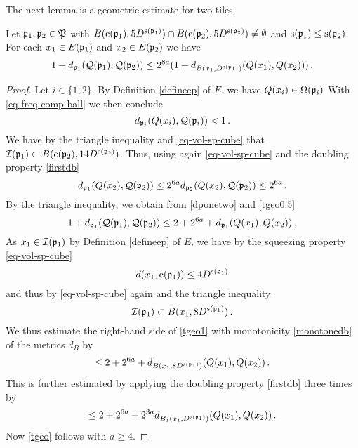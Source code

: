 The next lemma is a geometric estimate for two tiles.
\begin{lemma}\label{tile-uncertainty}
\leanok
{}
    Let ${\mathfrak p}_1, {\mathfrak p}_2\in {\mathfrak P}$ with
    $B({\mathrm{c}}({\mathfrak p}_1),5D^{{\mathrm{s}}({\mathfrak p}_1)}) \cap B({\mathrm{c}}({\mathfrak p}_2),5D^{{\mathrm{s}}({\mathfrak p}_2)}) \ne \emptyset$ and
${\mathrm{s}}({{\mathfrak p}_1})\leq {\mathrm{s}}({{\mathfrak p}_2})$. For each $x_1\in E({\mathfrak p}_1)$ and
$x_2\in E({\mathfrak p}_2)$ we have
\begin{equation}\label{tgeo}
  1+d_{{\mathfrak p}_1}({\mathcal{Q}}({\mathfrak p}_1), {\mathcal{Q}}({\mathfrak p}_2))\le
    2^{8a}(1 + d_{B(x_1, D^{{\mathrm{s}}({\mathfrak p}_1)})}({Q}(x_1),{Q}(x_2)))\, .
\end{equation}
\end{lemma}
\begin{proof}
\leanok
Let $i\in \{1,2\}$.
By Definition \eqref{defineep} of $E$,
we have ${Q}(x_i)\in {\Omega}({\mathfrak p}_i)$
With \eqref{eq-freq-comp-ball} we then conclude
\begin{equation}\label{dponetwo}
    d_{{\mathfrak p}_i}({Q}(x_i),{\mathcal{Q}}({\mathfrak p}_i)) < 1\, .
\end{equation}
We have by the triangle inequality and \eqref{eq-vol-sp-cube} that ${\mathcal{I}}({\mathfrak p}_1) \subset B({\mathrm{c}}({\mathfrak p}_2),14D^{{\mathrm{s}}({\mathfrak p}_2)})$.
Thus, using again \eqref{eq-vol-sp-cube} and the doubling property \eqref{firstdb}
\begin{equation}\label{tgeo0.5}
    d_{{\mathfrak p}_1}({Q}(x_2), {\mathcal{Q}}({\mathfrak p}_2)) \le 2^{6a} d_{{\mathfrak p}_2}({Q}(x_2), {\mathcal{Q}}({\mathfrak p}_2)) \le 2^{6a}\,.
\end{equation}
By the triangle inequality, we obtain from \eqref{dponetwo} and
\eqref{tgeo0.5}
\begin{equation}\label{tgeo1}
     1+d_{{\mathfrak p}_1}({\mathcal{Q}}({\mathfrak p}_1), {\mathcal{Q}}({\mathfrak p}_2))\le 2 + 2^{6a} +d_{{\mathfrak p}_1}({Q}(x_1), {Q}(x_2))\, .
\end{equation}
As $x_1\in {\mathcal{I}}({\mathfrak p}_1)$ by Definition \eqref{defineep} of $E$, we have by the squeezing property \eqref{eq-vol-sp-cube}
\begin{equation}
    d(x_1,{\mathrm{c}}({\mathfrak p}_1))\le 4D^{{\mathrm{s}}({\mathfrak p}_1)}
\end{equation}
and thus by \eqref{eq-vol-sp-cube} again and the triangle inequality
\begin{equation}
    {\mathcal{I}}({\mathfrak p}_1)\subset B(x_1,8D^{{\mathrm{s}}({\mathfrak p}_1)})\, .
\end{equation}
We thus estimate the right-hand side of \eqref{tgeo1} with monotonicity \eqref{monotonedb} of the metrics $d_B$ by
\begin{equation}\label{tgeo1.5}
    \le 2 + 2^{6a} + d_{B(x_1,8D^{{\mathrm{s}}({\mathfrak p}_1)})}({Q}(x_1), {Q}(x_2))\, .
\end{equation}
This is further estimated by applying the doubling property \eqref{firstdb} three times by
\begin{equation}\label{tgeo2}
    \le 2 + 2^{6a} +2^{3a}d_{B_1(x_1, D^{{\mathrm{s}}({\mathfrak p}_1)})}({Q}(x_1), {Q}(x_2))\, .
\end{equation}
Now \eqref{tgeo} follows with $a\ge 4$.
\end{proof}


